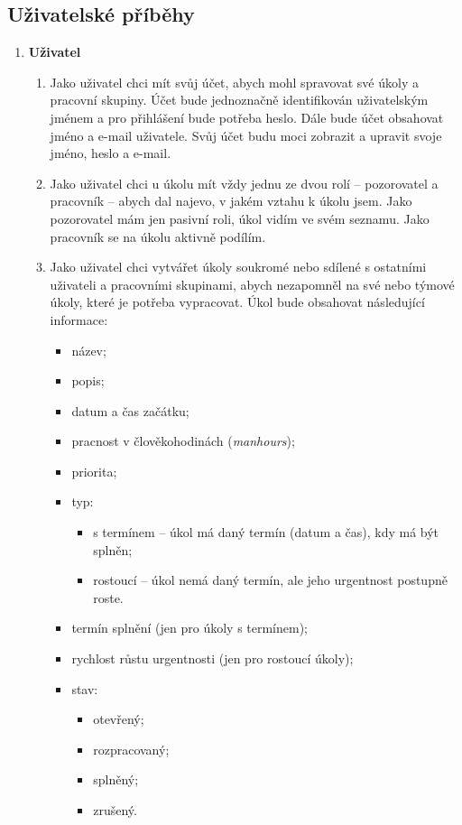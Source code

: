 \documentclass[thesis=B,czech]{FITthesis}[2012/06/26]
\begin{document}
		\subsection{Uživatelské příběhy}
		\label{sec:user-stories}
		\begin{enumerate}
			\item \textbf{Uživatel}
			\begin{enumerate}
				\item Jako uživatel chci mít svůj účet, abych mohl spravovat své úkoly a pracovní skupiny. Účet bude jednoznačně identifikován uživatelským jménem a pro přihlášení bude potřeba heslo. Dále bude účet obsahovat jméno a e-mail uživatele. Svůj účet budu moci zobrazit a upravit svoje jméno, heslo a e-mail.
				
				\item Jako uživatel chci u úkolu mít vždy jednu ze dvou rolí -- pozorovatel a pracovník -- abych dal najevo, v jakém vztahu k úkolu jsem. Jako pozorovatel mám jen pasivní roli, úkol vidím ve svém seznamu. Jako pracovník se na úkolu aktivně podílím.
				
				\item Jako uživatel chci vytvářet úkoly soukromé nebo sdílené s ostatními uživateli a pracovními skupinami, abych nezapomněl na své nebo týmové úkoly, které je potřeba vypracovat. Úkol bude obsahovat následující informace:
				\begin{itemize}
					\item název;
					\item popis;
					\item datum a čas začátku;
					\item pracnost v člověkohodinách (\textit{manhours});
					\item priorita;
					\item typ:
					\begin{itemize}
						\item s termínem -- úkol má daný termín (datum a čas), kdy má být splněn;
						\item rostoucí -- úkol nemá daný termín, ale jeho urgentnost postupně roste.
					\end{itemize}
					\item termín splnění (jen pro úkoly s termínem);
					\item rychlost růstu urgentnosti (jen pro rostoucí úkoly);
					\item stav:
					\begin{itemize}
						\item otevřený;
						\item rozpracovaný;
						\item splněný;
						\item zrušený.
					\end{itemize}
				\end{itemize}
				

\end{enumerate}
\end{enumerate}
\end{document}
